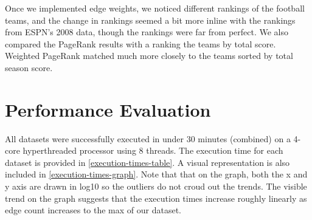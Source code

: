 \documentclass{report}
\newcommand{\pagerank}{PageRank }
\begin{document}
Once we implemented edge weights, we noticed different rankings of the football
teams, and the change in rankings seemed a bit more inline with the rankings
from ESPN's 2008 data, though the rankings were far from perfect. We also
compared the \pagerank results with a ranking the teams by total score. Weighted
\pagerank matched much more closely to the teams sorted by total season score.

\section{Performance Evaluation}
All datasets were successfully executed in under 30 minutes (combined) on a 4-core hyperthreaded processor using 8 threads. The execution time for each dataset is provided in \cref{execution-times-table}. A visual representation is also included in \cref{execution-times-graph}. Note that that on the graph, both the x and y axis are drawn in log10 so the outliers do not croud out the trends. The visible trend on the graph suggests that the execution times increase roughly linearly as edge count increases to the max of our dataset.  
\end{document}
